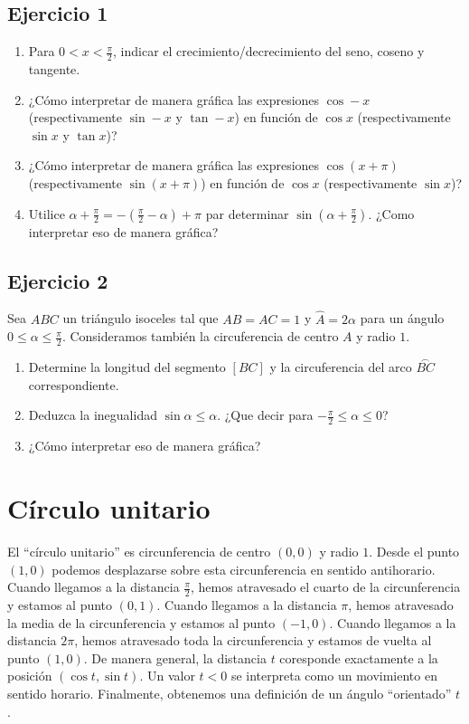 \subsection{Ejercicio 1}

\begin{enumerate}
\item Para $0 < x < \frac{\pi}{2}$, indicar el crecimiento/decrecimiento
  del seno, coseno y tangente.
\item ¿Cómo interpretar de manera gráfica las expresiones
  $\cos -x$ (respectivamente $\sin -x$ y $\tan -x$)
  en función de $\cos x$ (respectivamente $\sin x$ y $\tan x$)?
\item ¿Cómo interpretar de manera gráfica las expresiones
  $\cos \left(x+\pi\right)$ (respectivamente $\sin \left(x+\pi\right)$)
  en función de $\cos x$ (respectivamente $\sin x$)?
\item Utilice $\alpha+\frac{\pi}{2} =
  -\left(\frac{\pi}{2}-\alpha\right) + \pi$ par determinar
  $\sin\left(\alpha+\frac{\pi}{2}\right)$. ¿Como interpretar eso de manera
  gráfica?
\end{enumerate}

\subsection{Ejercicio 2}

Sea $ABC$ un triángulo isoceles tal que $AB=AC=1$ y
$\widehat{A} = 2\alpha$ para un ángulo $0 \leq \alpha \leq \frac{\pi}{2}$.
Consideramos también la circuferencia de centro $A$ y radio $1$.

\begin{enumerate}
\item Determine la longitud del segmento $[BC]$ y la circuferencia del arco
$\overset{\frown}{BC}$ correspondiente.
\item Deduzca la inegualidad $\sin \alpha \leq \alpha$.
  ¿Que decir para $-\frac{\pi}{2} \leq \alpha \leq 0$? 
\item ¿Cómo interpretar eso de manera gráfica?
\end{enumerate}

\section{Círculo unitario}

El ``círculo unitario'' es circunferencia de centro $(0,0)$ y radio $1$.
Desde el punto $(1,0)$ podemos desplazarse sobre esta circunferencia en sentido
antihorario. Cuando llegamos a la distancia $\frac{\pi}{2}$, hemos atravesado
el cuarto de la circunferencia y estamos al punto $(0,1)$. Cuando llegamos a
la distancia $\pi$, hemos atravesado la media de la circunferencia y estamos
al punto $(-1,0)$. Cuando llegamos a la distancia $2\pi$, hemos atravesado
toda la circunferencia y estamos de vuelta al punto $(1,0)$. De manera
general, la distancia $t$ coresponde exactamente a la posición
$\left(\cos t, \sin t\right)$. Un valor $t < 0$ se interpreta como un
movimiento en sentido horario. Finalmente, obtenemos una definición de un
ángulo ``orientado'' $t$.

